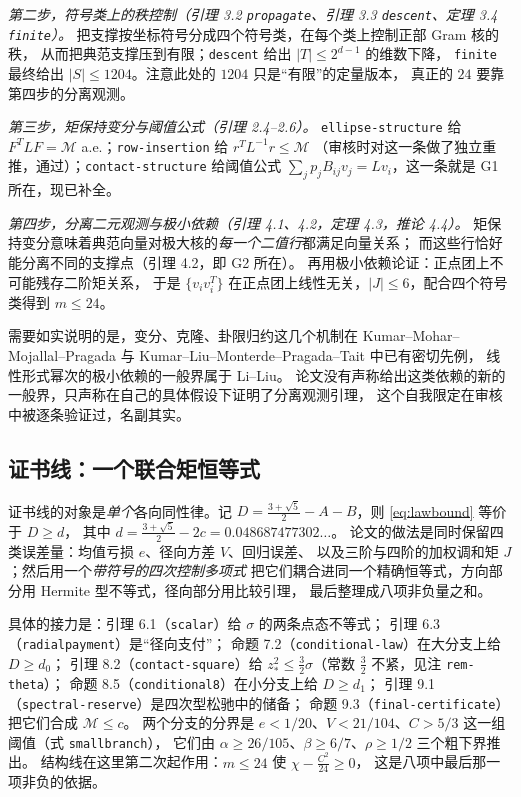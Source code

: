 \documentclass[UTF8,11pt]{ctexart}
\newcommand{\M}{\mathcal{M}}
\newcommand{\file}[1]{\texttt{#1}}
\begin{document}
\emph{第二步，符号类上的秩控制（引理 3.2 \file{propagate}、引理 3.3 \file{descent}、定理 3.4 \file{finite}）。}
把支撑按坐标符号分成四个符号类，在每个类上控制正部 Gram 核的秩，
从而把典范支撑压到有限；\file{descent} 给出 $|T|\le2^{d-1}$ 的维数下降，
\file{finite} 最终给出 $|S|\le1204$。注意此处的 $1204$ 只是``有限''的定量版本，
真正的 $24$ 要靠第四步的分离观测。

\emph{第三步，矩保持变分与阈值公式（引理 2.4--2.6）。}
\file{ellipse-structure} 给 $F^TLF=\M$ a.e.；\file{row-insertion} 给 $r^TL^{-1}r\le\M$
（审核时对这一条做了独立重推，通过）；\file{contact-structure} 给阈值公式
$\sum_jp_jB_{ij}v_j=Lv_i$，这一条就是 G1 所在，现已补全。

\emph{第四步，分离二元观测与极小依赖（引理 4.1、4.2，定理 4.3，推论 4.4）。}
矩保持变分意味着典范向量对极大核的\emph{每一个二值行}都满足向量关系；
而这些行恰好能分离不同的支撑点（引理 4.2，即 G2 所在）。
再用极小依赖论证：正点团上不可能残存二阶矩关系，
于是 $\{v_iv_i^T\}$ 在正点团上线性无关，$|J|\le6$，配合四个符号类得到 $m\le24$。

需要如实说明的是，变分、克隆、卦限归约这几个机制在
Kumar--Mohar--Mojallal--Pragada 与 Kumar--Liu--Monterde--Pragada--Tait 中已有密切先例，
线性形式幂次的极小依赖的一般界属于 Li--Liu。
论文没有声称给出这类依赖的新的一般界，只声称在自己的具体假设下证明了分离观测引理，
这个自我限定在审核中被逐条验证过，名副其实。

\subsection{证书线：一个联合矩恒等式}

证书线的对象是\emph{单个}各向同性律。记
$D=\frac{3+\sqrt5}{2}-A-B$，则 \eqref{eq:lawbound} 等价于 $D\ge d$，
其中 $d=\frac{3+\sqrt5}{2}-2c=0.048687477302\ldots$。
论文的做法是同时保留四类误差量：均值亏损 $e$、径向方差 $V$、回归误差、
以及三阶与四阶的加权调和矩 $J$；然后用一个\emph{带符号的四次控制多项式}
把它们耦合进同一个精确恒等式，方向部分用 Hermite 型不等式，径向部分用比较引理，
最后整理成八项非负量之和。

具体的接力是：引理 6.1（\file{scalar}）给 $\sigma$ 的两条点态不等式；
引理 6.3（\file{radialpayment}）是``径向支付''；
命题 7.2（\file{conditional-law}）在大分支上给 $D\ge d_0$；
引理 8.2（\file{contact-square}）给 $z_*^2\le\frac32\sigma$（常数 $\frac32$ 不紧，见注 \file{rem-theta}）；
命题 8.5（\file{conditional8}）在小分支上给 $D\ge d_1$；
引理 9.1（\file{spectral-reserve}）是四次型松驰中的储备；
命题 9.3（\file{final-certificate}）把它们合成 $\M\le c$。
两个分支的分界是 $e<1/20$、$V<21/104$、$C>5/3$ 这一组阈值（式 \file{smallbranch}），
它们由 $\alpha\ge26/105$、$\beta\ge6/7$、$\rho\ge1/2$ 三个粗下界推出。
结构线在这里第二次起作用：$m\le24$ 使 $\chi-\frac{C^2}{24}\ge0$，
这是八项中最后那一项非负的依据。
\end{document}
